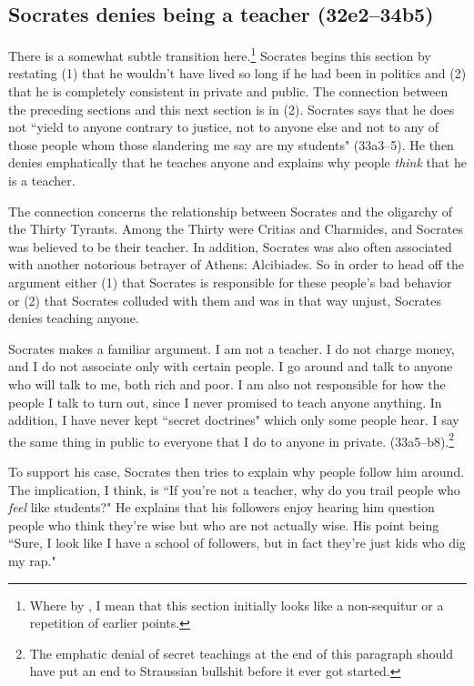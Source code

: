 \documentclass[11pt]{article}
\begin{document}
\subsection{Socrates denies being a teacher (32e2--34b5)}

There is a somewhat subtle transition here.\footnote{Where by , I mean that this section initially looks like a non-sequitur or a repetition of earlier points.}  Socrates begins this section by restating (1) that he wouldn't have lived so long if he had been in politics and (2) that he is completely consistent in private and public.  The connection between the preceding sections and this next section is in (2).  Socrates says that he does not ``yield to anyone contrary to justice, not to anyone else and not to any of those people whom those slandering me say are my students" (33a3--5).  He then denies emphatically that he teaches anyone and explains why people \emph{think} that he is a teacher.

The connection concerns the relationship between Socrates and the oligarchy of the Thirty Tyrants.  Among the Thirty were Critias and Charmides, and Socrates was believed to be their teacher.  In addition, Socrates was also often associated with another notorious betrayer of Athens: Alcibiades.  So in order to head off the argument either (1) that Socrates is responsible for these people's bad behavior or (2) that Socrates colluded with them and was in that way unjust, Socrates denies teaching anyone.

Socrates makes a familiar argument.  I am not a teacher.  I do not charge money, and I do not associate only with certain people.  I go around and talk to anyone who will talk to me, both rich and poor.  I am also not responsible for how the people I talk to turn out, since I never promised to teach anyone anything.  In addition, I have never kept ``secret doctrines" which only some people hear.  I say the same thing in public to everyone that I do to anyone in private. (33a5--b8).\footnote{The emphatic denial of secret teachings at the end of this paragraph should have put an end to Straussian bullshit before it ever got started.}

To support his case, Socrates then tries to explain why people follow him around.  The implication, I think, is ``If you're not a teacher, why do you trail people who \emph{feel} like students?"  He explains that his followers enjoy hearing him question people who think they're wise but who are not actually wise.  His point being ``Sure, I look like I have a school of followers, but in fact they're just kids who dig my rap."
\end{document}
